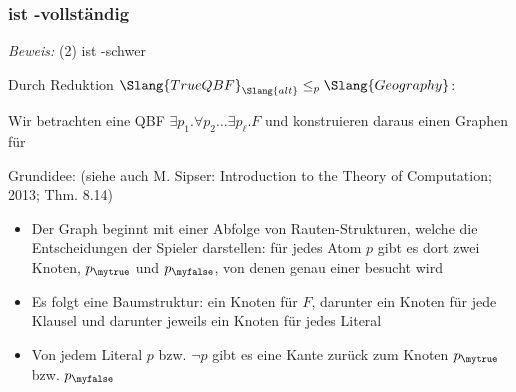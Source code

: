 \documentclass[aspectratio=1610,onlymath]{beamer}
\begin{document}
\begin{frame}[t]\frametitle{ ist \PSpace-vollständig }

\vspace{-1ex}
\pause

\emph{Beweis:} (2)  ist \PSpace-schwer\pause
\smallskip

Durch Reduktion $\Slang{TrueQBF}_{\Slang{alt}}\leq_p \Slang{Geography}$:

Wir betrachten eine QBF $\exists p_1.\forall p_2\ldots \exists p_\ell. F$
und konstruieren daraus einen Graphen für  \bigskip

\alert{Grundidee:} {\tiny (siehe auch M. Sipser: Introduction to the Theory of Computation; 2013; Thm. 8.14)}
\begin{itemize}
\item Der Graph beginnt mit einer Abfolge von Rauten-Strukturen, welche die 
Entscheidungen der Spieler darstellen: für jedes Atom $p$ gibt es dort zwei Knoten, $p_{\mytrue}$ und $p_{\myfalse}$, von denen genau einer besucht wird
\item Es folgt eine Baumstruktur: ein Knoten für $F$, darunter ein Knoten für jede Klausel und darunter jeweils ein Knoten für jedes Literal
\item Von jedem Literal $p$ bzw. $\neg p$ gibt es eine Kante zurück zum Knoten $p_{\mytrue}$ bzw. $p_{\myfalse}$
\end{itemize}


\end{frame}
\end{document}
